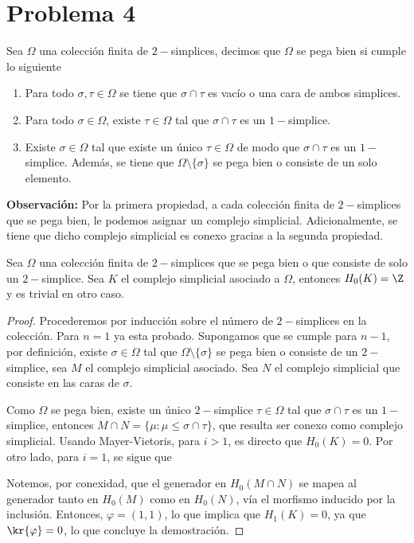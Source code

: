 \documentclass{article}
\begin{document}
\section*{Problema 4}
\noindent Sea $\Omega$ una colección finita de $2-$simplices, decimos que $\Omega$ se pega bien si 
cumple lo siguiente
\begin{enumerate}
    \item Para todo $\sigma,\tau\in\Omega$ se tiene que $\sigma\cap\tau$ es vacío o una cara de 
    ambos simplices.
    \item Para todo $\sigma\in\Omega$, existe $\tau\in\Omega$ tal que $\sigma\cap\tau$ es un 
    $1-$simplice.
    \item Existe $\sigma\in\Omega$ tal que existe un único $\tau\in\Omega$ de modo que 
    $\sigma\cap\tau$ es un $1-$simplice. Además, se tiene que $\Omega\setminus\{\sigma\}$ se pega 
    bien o consiste de un solo elemento.
\end{enumerate}
\noindent\textbf{Observación:} Por la primera propiedad, a cada colección finita de 
$2-$simplices que se pega bien, le podemos asignar un complejo simplicial. Adicionalmente, se 
tiene que dicho complejo simplicial es conexo gracias a la segunda propiedad.

\vspace{2mm}
\begin{lema}
    Sea $\Omega$ una colección finita de $2-$simplices que se pega bien o que consiste de solo un
    $2-$simplice. Sea $K$ el complejo simplicial asociado a $\Omega$, entonces $H_{0}(K)=\Z$ y es 
    trivial en otro caso.
\end{lema}
\begin{proof}
    Procederemos por inducción sobre el número de $2-$simplices en la colección. Para $n=1$ ya
    esta probado. Supongamos que se cumple para $n-1$, por definición, existe $\sigma\in\Omega$ 
    tal que $\Omega\setminus\{\sigma\}$ se pega bien o consiste de un $2-$simplice, sea $M$ el 
    complejo simplicial asociado. Sea $N$ el complejo simplicial que consiste en las caras de 
    $\sigma$.

    \vspace{1mm}
    Como $\Omega$ se pega bien, existe un único $2-$simplice $\tau\in\Omega$ tal que 
    $\sigma\cap\tau$ es un $1-$simplice, entonces $M\cap N=\{\mu:\mu\leq\sigma\cap\tau\}$, que 
    resulta ser conexo como complejo simplicial. Usando Mayer-Vietoris, para $i>1$, es directo
    que $H_{0}(K)=0$. Por otro lado, para $i=1$, se sigue que

    \vspace{2mm}
    \centerline{
    }
    
    \vspace{1mm}
    Notemos, por conexidad, que el generador en $H_{0}(M\cap N)$ se mapea al generador tanto en 
    $H_{0}(M)$ como en $H_{0}(N)$, vía el morfismo inducido por la inclusión. Entonces, 
    $\varphi=(1,1)$, lo que implica que $H_{1}(K)=0$, ya que $\kr{\varphi}=0$, lo que concluye la 
    demostración.
\end{proof}
\end{document}
